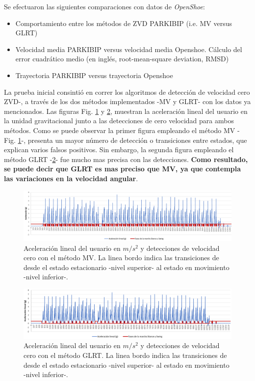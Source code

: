 Se efectuaron las siguientes comparaciones con datos de \textit{OpenShoe}:
\begin{itemize}
    \item Comportamiento entre los métodos de ZVD PARKIBIP (i.e. MV versus GLRT)
    \item Velocidad media PARKIBIP versus velocidad media Openshoe. Cálculo del error cuadrático medio (en inglés, root-mean-square deviation, RMSD)
    \item Trayectoria PARKIBIP versus trayectoria Openshoe
\end{itemize}

La prueba inicial consintió en correr los algoritmos de detección de velocidad cero ZVD-, a través de los dos métodos implementados -MV y GLRT- con los datos ya mencionados. Las figuras Fig. \ref{fig:openshoe-mv} y \ref{fig:openshoe-glrt}, muestran la aceleración lineal del usuario en la unidad gravitacional junto a las detecciones de cero velocidad para ambos métodos. Como se puede observar la primer figura empleando el método MV -Fig. \ref{fig:openshoe-mv}-, presenta un mayor número de detección o transiciones entre estados, que explican varios falsos positivos. Sin embargo, la segunda figura empleando el método GLRT -\ref{fig:openshoe-glrt}- fue mucho mas precisa con las detecciones. \textbf{Como resultado, se puede decir que GLRT es mas preciso que MV, ya que contempla las variaciones en la velocidad angular}.

\begin{figure}[h!]
\hspace*{-2.9cm}%
\includegraphics[clip,width=1.4 \columnwidth]{TESIS/imagenes/chap06/acceleration-zvd-openshoe-mv.PNG}
\caption{Aceleración lineal del usuario en $m/s^2$ y detecciones de velocidad cero con el método MV. La linea bordo indica las transiciones de desde el estado estacionario -nivel superior- al estado en movimiento -nivel inferior-.}
\label{fig:openshoe-mv}
\end{figure}

\begin{figure}[h!]
\hspace*{-2.9cm}%
\includegraphics[clip,width=1.4 \columnwidth]{TESIS/imagenes/chap06/acceleration-zvd-openshoe-glrt.PNG}
\caption{Aceleración lineal del usuario en $m/s^2$ y detecciones de velocidad cero con el método GLRT. La linea bordo indica las transiciones de desde el estado estacionario -nivel superior- al estado en movimiento -nivel inferior-.}
\label{fig:openshoe-glrt}
\end{figure}

